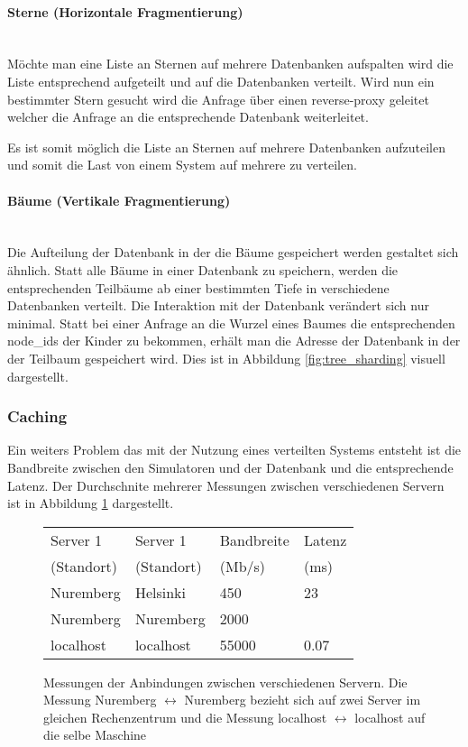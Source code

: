 \paragraph{Sterne (Horizontale Fragmentierung)} ~\\
Möchte man eine Liste an Sternen auf mehrere Datenbanken aufspalten wird die
Liste entsprechend aufgeteilt und auf die Datenbanken verteilt. Wird nun ein
bestimmter Stern gesucht wird die Anfrage über einen reverse-proxy geleitet
welcher die Anfrage an die entsprechende Datenbank weiterleitet. 

\par Es ist somit möglich die Liste an Sternen auf mehrere Datenbanken
aufzuteilen und somit die Last von einem System auf mehrere zu verteilen.

\paragraph{Bäume (Vertikale Fragmentierung)} ~\\
Die Aufteilung der Datenbank in der die Bäume gespeichert werden gestaltet sich
ähnlich. Statt alle Bäume in einer Datenbank zu speichern, werden die
entsprechenden Teilbäume ab einer bestimmten Tiefe in verschiedene Datenbanken
verteilt. Die Interaktion mit der Datenbank verändert sich nur minimal. Statt
bei einer Anfrage an die Wurzel eines Baumes die entsprechenden node\_ids der
Kinder zu bekommen, erhält man die Adresse der Datenbank in der der Teilbaum
gespeichert wird. Dies ist in Abbildung \ref{fig:tree_sharding} visuell dargestellt.

\subsubsection{Caching}
Ein weiters Problem das mit der Nutzung eines verteilten Systems entsteht ist
die Bandbreite zwischen den Simulatoren und der Datenbank und die entsprechende
Latenz. Der Durchschnite mehrerer Messungen zwischen verschiedenen Servern ist
in Abbildung \ref{fig:bandwidth_latency} dargestellt.

\begin{figure}
    \centering
    \begin{tabular} {l | l | l | l}
        Server 1 & Server 1 & Bandbreite & Latenz \\
        (Standort) & (Standort) & (Mb/s) & (ms) \\ \hline\hline
        Nuremberg & Helsinki & 450 & 23 \\ \hline
        Nuremberg & Nuremberg & 2000 & \\ \hline
        localhost & localhost & 55000 & 0.07 \\ \hline
    \end{tabular}
    \caption{Messungen der Anbindungen zwischen verschiedenen Servern. Die Messung
    Nuremberg \( \leftrightarrow \) Nuremberg bezieht sich auf zwei Server im
    gleichen Rechenzentrum und die Messung localhost \( \leftrightarrow \)
    localhost auf die selbe Maschine}
    \label{fig:bandwidth_latency}
\end{figure}

